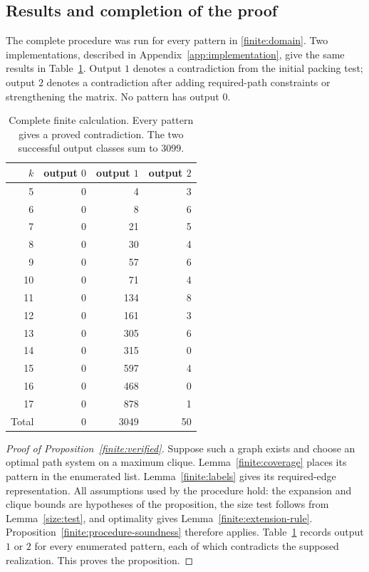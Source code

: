\subsection{Results and completion of the proof}

The complete procedure was run for every pattern in
\eqref{finite:domain}. Two implementations, described in
Appendix~\ref{app:implementation}, give the same results in
Table~\ref{finite:results}. Output $1$ denotes a contradiction from the
initial packing test; output $2$ denotes a contradiction after adding
required-path constraints or strengthening the matrix. No pattern has
output $0$.

\begin{table}[htbp]
\centering
\begin{tabular}{rrrr}
\toprule
$k$ & output $0$ & output $1$ & output $2$\\
\midrule
5&0&4&3\\
6&0&8&6\\
7&0&21&5\\
8&0&30&4\\
9&0&57&6\\
10&0&71&4\\
11&0&134&8\\
12&0&161&3\\
13&0&305&6\\
14&0&315&0\\
15&0&597&4\\
16&0&468&0\\
17&0&878&1\\
\midrule
Total&0&3049&50\\
\bottomrule
\end{tabular}
\caption{Complete finite calculation. Every pattern gives a proved
contradiction. The two successful output classes sum to $3099$.}
\label{finite:results}
\end{table}

\begin{proof}[Proof of Proposition~\ref{finite:verified}]
Suppose such a graph exists and choose an optimal path system on a
maximum clique. Lemma~\ref{finite:coverage} places its pattern in the
enumerated list. Lemma~\ref{finite:labels} gives its required-edge
representation. All assumptions used by the procedure hold: the
expansion and clique bounds are hypotheses of the proposition, the
size test follows from Lemma~\ref{size:test}, and optimality gives
Lemma~\ref{finite:extension-rule}. Proposition~\ref{finite:procedure-soundness}
therefore applies. Table~\ref{finite:results} records output $1$ or $2$
for every enumerated pattern, each of which contradicts the supposed
realization. This proves the proposition.
\end{proof}


